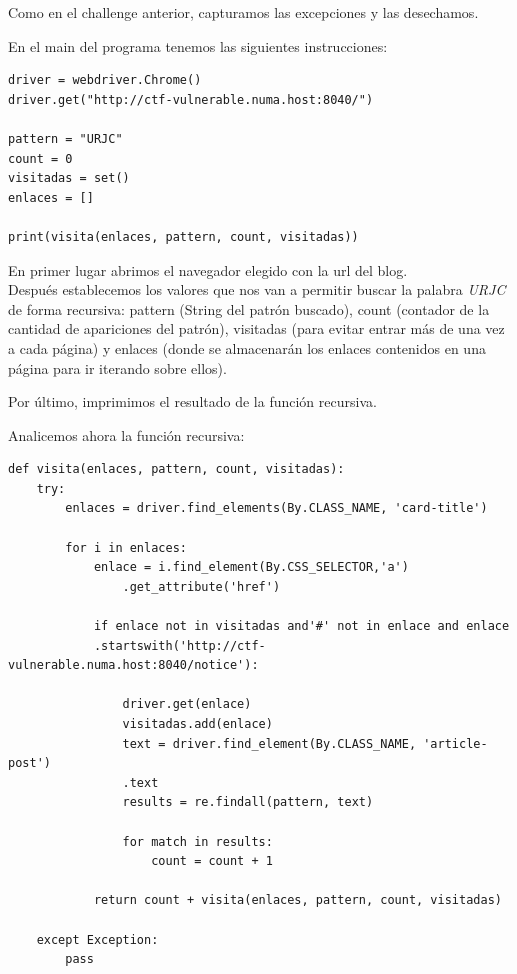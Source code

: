 \documentclass[12pt, a4paper,twoside,titlepage]{article}
\begin{document}
Como en el challenge anterior, capturamos las excepciones y las desechamos.\\

\vspace{4mm}

En el main del programa tenemos las siguientes instrucciones:

\begin{verbatim}
driver = webdriver.Chrome()
driver.get("http://ctf-vulnerable.numa.host:8040/") 

pattern = "URJC"
count = 0
visitadas = set()
enlaces = []

print(visita(enlaces, pattern, count, visitadas))
\end{verbatim}

En primer lugar abrimos el navegador elegido con la url del blog.\\ Después establecemos los valores que nos van a permitir buscar la palabra \emph{URJC} de forma recursiva: pattern (String del patrón buscado), count (contador de la cantidad de apariciones del patrón), visitadas (para evitar entrar más de una vez a cada página) y enlaces (donde se almacenarán los enlaces contenidos en una página para ir iterando sobre ellos).

\vspace{4mm}

Por último, imprimimos el resultado de la función recursiva.\\

\newpage

Analicemos ahora la función recursiva:

\begin{verbatim}
def visita(enlaces, pattern, count, visitadas):
    try:
        enlaces = driver.find_elements(By.CLASS_NAME, 'card-title')

        for i in enlaces:
            enlace = i.find_element(By.CSS_SELECTOR,'a')
                .get_attribute('href')
        
            if enlace not in visitadas and'#' not in enlace and enlace
            .startswith('http://ctf-vulnerable.numa.host:8040/notice'):

                driver.get(enlace)
                visitadas.add(enlace)
                text = driver.find_element(By.CLASS_NAME, 'article-post')
                .text
                results = re.findall(pattern, text)

                for match in results:
                    count = count + 1

            return count + visita(enlaces, pattern, count, visitadas)
            
    except Exception:
        pass
\end{verbatim}
\end{document}
